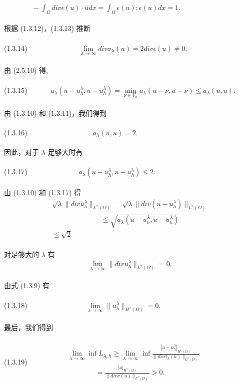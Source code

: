 \documentclass[a4paper,UTF8,titlepage]{ctexart}
\begin{document}
	$
	\quad \quad \quad \quad
	- \int_{\Omega} div \epsilon(u) \cdot u dx = \int_{\Omega} \epsilon(u) : \epsilon(u) dx = 1.
	$
	\\ \\
	根据 (1.3.12)，(1.3.13) 推断
	\\ \\
	(1.3.14)
	$
	\quad \quad \quad \quad \quad \quad \quad
	\lim\limits_{\lambda \to \infty} div \sigma_{\lambda}(u) = 2 div \epsilon(u) \ne 0. 
	$
	\\ \\
	由 (2.5.10) 得,
	\\ \\
	(1.3.15)
	$
	\quad \quad \quad 
	a_{\lambda}(u-u_h^{\lambda}, u-u_h^{\lambda}) = \min\limits_{\nu \in V_h} a_{\lambda}(u-\nu,u-\nu) \le a_{\lambda}(u,u).
	$
	\\ \\
	由 (1.3.10) 和 (1.3.11)，我们得到
	\\ \\
	(1.3.16)
	$
	\quad \quad \quad \quad \quad \quad \quad \quad \quad
	a_{\lambda}(u,u) = 2.
	$
	\\ \\
	因此，对于 $\lambda$ 足够大时有
	\\ \\
	(1.3.17)
	$
	\quad \quad \quad \quad \quad \quad \quad 
	a_{\lambda} (u-u_h^{\lambda}, u-u_h^{\lambda}) \le 2.
	$
	\\ \\ 
	由 (1.3.10) 和 (1.3.17) 得
	\\
	$$
	\begin{matrix}
		\sqrt{\lambda} \| div u_h^{\lambda} \|_{L^2(\Omega)} = \sqrt{\lambda} \| div(u-u_h^{\lambda}) \|_{L^2(\Omega)} \\ 
		\quad \quad \quad \quad \quad \quad \quad
		\le \sqrt{a_{\lambda}(u-u_h^{\lambda}, u-u_h^{\lambda})} \\
		\le \sqrt{2}	
	\end{matrix}
	$$
	\\
	对足够大的 $\lambda$ 有
	$$
	\lim\limits_{\lambda \to \infty} \| div u_h^{\lambda} \|_{L^2(\Omega)} = 0.
	$$
	\\
	由式 (1.3.9) 有
	\\ \\
	(1.3.18)
	$
	\quad \quad \quad \quad \quad \quad \quad \quad 
	\lim\limits_{\lambda \to \infty} \| u_h^{\lambda} \|_{H^1(\Omega)} = 0.
	$
	\\ \\
	最后，我们得到 %
	\\ \\
	(1.3.19) 
	$
	\quad \quad \quad \quad \quad 
	\begin{matrix}
		\lim\limits_{\lambda \to \infty}\inf L_{\lambda,h} \ge \lim\limits_{\lambda \to \infty}\inf \frac{|u-u_h^{\lambda}|_{H^1(\Omega)}}{\| div \sigma_{\lambda}(u) \|_{L^2(\Omega)}} \\
		\quad \quad \quad \quad
		= \frac{|u|_{H^1(\Omega)}}{\| div \sigma(u) \|_{L^2(\Omega)}} > 0.
	\end{matrix}
	$
\end{document}
